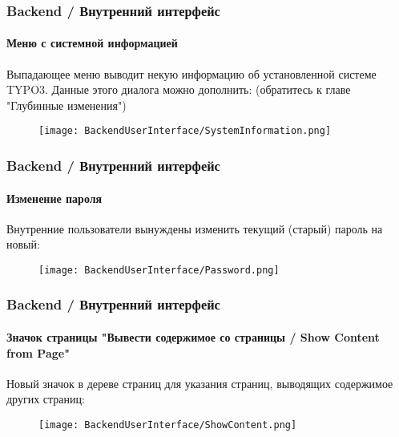 \begin{frame}[fragile]
	\frametitle{Backend / Внутренний интерфейс}
	\framesubtitle{Меню с системной информацией}

	Выпадающее меню выводит некую информацию об установленной системе TYPO3.
	Данные этого диалога можно дополнить:\newline
	\small(обратитесь к главе "Глубинные изменения")\normalsize

	\begin{figure}
		\texttt{[image: BackendUserInterface/SystemInformation.png]}
	\end{figure}

\end{frame}

\begin{frame}[fragile]
	\frametitle{Backend / Внутренний интерфейс}
	\framesubtitle{Изменение пароля}

	Внутренние пользователи вынуждены изменить текущий (старый) пароль на новый:

	\begin{figure}
		\texttt{[image: BackendUserInterface/Password.png]}
	\end{figure}

\end{frame}

\begin{frame}[fragile]
	\frametitle{Backend / Внутренний интерфейс}
	\framesubtitle{Значок страницы "Вывести содержимое со страницы / Show Content from Page"}

	Новый значок в дереве страниц для указания страниц, выводящих содержимое других страниц:

	\begin{figure}
		\texttt{[image: BackendUserInterface/ShowContent.png]}
	\end{figure}

\end{frame}

